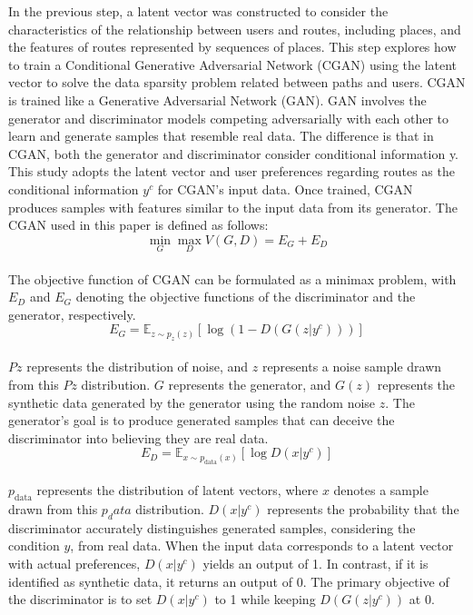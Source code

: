 \documentclass[]{article}
\begin{document}
In the previous step, a latent vector was constructed to consider the characteristics of the relationship between users and routes, including places, and the features of routes represented by sequences of places. This step explores how to train a Conditional Generative Adversarial Network (CGAN) using the latent vector to solve the data sparsity problem related between paths and users. CGAN is trained like a Generative Adversarial Network (GAN). GAN involves the generator and discriminator models competing adversarially with each other to learn and generate samples that resemble real data. The difference is that in CGAN, both the generator and discriminator consider conditional information y. This study adopts the latent vector and user preferences regarding routes as the conditional information $y^c$ for CGAN's input data. Once trained, CGAN produces samples with features similar to the input data from its generator. The CGAN used in this paper is defined as follows:\\
\begin{equation}
	\min_G \max_D V(G, D) = E_G + E_D
\end{equation}
\\
The objective function of CGAN can be formulated as a minimax problem, with $E_D$ and $E_G$ denoting the objective functions of the discriminator and the generator, respectively.\\
\begin{equation}
	E_G = \mathbb{E}_{z \sim p_z(z)}[\log(1 - D(G(z|y^c)))]
\end{equation}
\\
$Pz$ represents the distribution of noise, and $z$ represents a noise sample drawn from this $Pz$ distribution. $G$ represents the generator, and $G(z)$ represents the synthetic data generated by the generator using the random noise $z$. The generator's goal is to produce generated samples that can deceive the discriminator into believing they are real data.\\
\begin{equation}
	E_D = \mathbb{E}_{x \sim p_{\text{data}}(x)}[\log D(x|y^c)]
\end{equation}
\\
$p_{\text{data}}$ represents the distribution of latent vectors, where $x$ denotes a sample drawn from this $p_data$ distribution. $D(x|y^c)$ represents the probability that the discriminator accurately distinguishes generated samples, considering the condition $y$, from real data. When the input data corresponds to a latent vector with actual preferences, $D(x|y^c)$ yields an output of 1. In contrast, if it is identified as synthetic data, it returns an output of 0. The primary objective of the discriminator is to set $D(x|y^c)$ to 1 while keeping $D(G(z|y^c))$ at 0.
\end{document}

